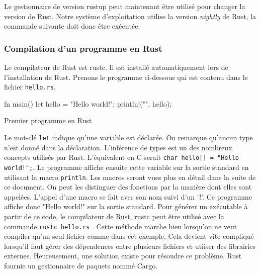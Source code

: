 Le gestionnaire de version rustup peut maintenant être utilisé pour changer la
version de Rust. Notre système d'exploitation utilise la version \textit{nightly}
de Rust, la commande suivante doit donc être exécutée.



\subsubsection{Compilation d'un programme en Rust}
Le compilateur de Rust est rustc. Il est installé automatiquement lors de
l'installation de Rust. Prenons le programme ci-dessous qui est contenu
dans le fichier \texttt{hello.rs}.

\begin{code}
\begin{rustcode}
fn main() {
    let hello = "Hello world!";
    println!("{}", hello);
}
\end{rustcode}
\caption{Premier programme en Rust}
\label{lst:rust:hello}
\end{code} \bigbreak

Le mot-clé \texttt{let} indique qu'une variable est déclarée. On remarque
qu'aucun type n'est donné dans la déclaration. L'inférence de types est un des
nombreux concepts utilisés par Rust. L'équivalent en C serait
\texttt{char hello[] = "Hello world!";}. Le programme affiche ensuite cette
variable sur la sortie standard en utilisant la macro \texttt{println}.
Les macros seront vues plus en détail dans la suite de ce document. On peut les
distinguer des fonctions par la manière dont elles sont appelées. L'appel d'une
macro se fait avec son nom suivi d'un '!'. Ce programme affiche donc "Hello world!"
sur la sortie standard. Pour générer un exécutable à partir de ce code, le compilateur
de Rust, rustc peut être utilisé avec la commande \texttt{rustc hello.rs}
\cite{ref2}. Cette méthode marche bien lorsqu'on ne veut compiler qu'un seul fichier
comme dans cet exemple. Cela devient vite compliqué lorsqu'il faut gérer des dépendences
entre plusieurs fichiers et utiiser des librairies externes. Heureusement,
une solution existe pour résoudre ce problème. Rust fournie un gestionnaire
de paquets nommé Cargo.


